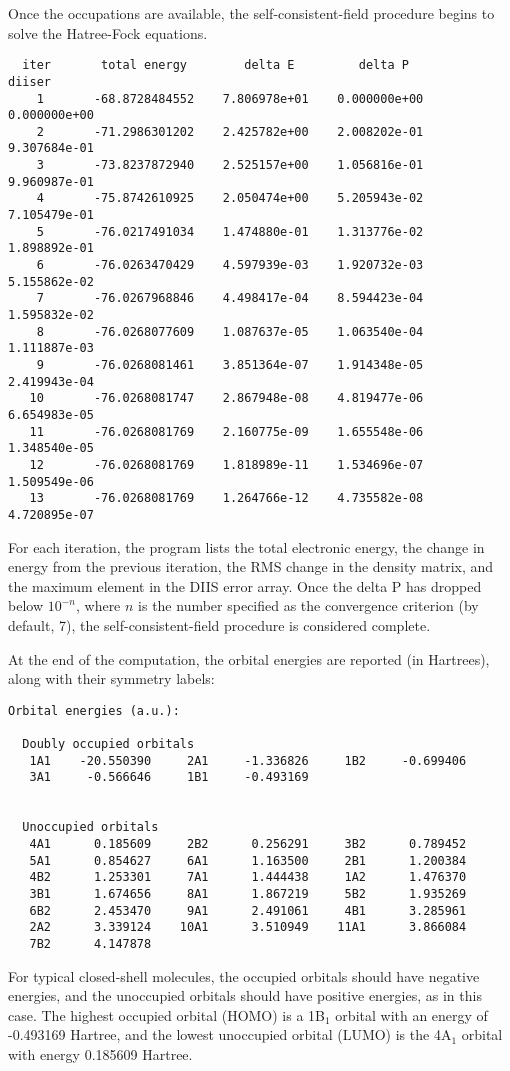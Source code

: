 Once the occupations are available, the self-consistent-field procedure
begins to solve the Hatree-Fock equations.  
\begin{verbatim}
  iter       total energy        delta E         delta P          diiser
    1       -68.8728484552    7.806978e+01    0.000000e+00    0.000000e+00
    2       -71.2986301202    2.425782e+00    2.008202e-01    9.307684e-01
    3       -73.8237872940    2.525157e+00    1.056816e-01    9.960987e-01
    4       -75.8742610925    2.050474e+00    5.205943e-02    7.105479e-01
    5       -76.0217491034    1.474880e-01    1.313776e-02    1.898892e-01
    6       -76.0263470429    4.597939e-03    1.920732e-03    5.155862e-02
    7       -76.0267968846    4.498417e-04    8.594423e-04    1.595832e-02
    8       -76.0268077609    1.087637e-05    1.063540e-04    1.111887e-03
    9       -76.0268081461    3.851364e-07    1.914348e-05    2.419943e-04
   10       -76.0268081747    2.867948e-08    4.819477e-06    6.654983e-05
   11       -76.0268081769    2.160775e-09    1.655548e-06    1.348540e-05
   12       -76.0268081769    1.818989e-11    1.534696e-07    1.509549e-06
   13       -76.0268081769    1.264766e-12    4.735582e-08    4.720895e-07
\end{verbatim}
For each iteration, the program lists the total electronic energy, the
change in energy from the previous iteration, the RMS change in the
density matrix, and the maximum element in the DIIS error array.  Once
the delta P has dropped below $10^{-n}$, where $n$ is the number specified
as the convergence criterion (by default, 7), the self-consistent-field
procedure is considered complete.  

At the end of the computation, the orbital energies are reported (in 
Hartrees), along with their symmetry labels:
\begin{verbatim}
Orbital energies (a.u.):
                                                                                
  Doubly occupied orbitals
   1A1    -20.550390     2A1     -1.336826     1B2     -0.699406
   3A1     -0.566646     1B1     -0.493169
                                                                                
                                                                                
  Unoccupied orbitals
   4A1      0.185609     2B2      0.256291     3B2      0.789452
   5A1      0.854627     6A1      1.163500     2B1      1.200384
   4B2      1.253301     7A1      1.444438     1A2      1.476370
   3B1      1.674656     8A1      1.867219     5B2      1.935269
   6B2      2.453470     9A1      2.491061     4B1      3.285961
   2A2      3.339124    10A1      3.510949    11A1      3.866084
   7B2      4.147878

\end{verbatim}
For typical closed-shell molecules, the occupied orbitals should have
negative energies, and the unoccupied orbitals should have positive
energies, as in this case.  The highest occupied orbital (HOMO) is
a 1B$_1$ orbital with an energy of -0.493169 Hartree, and the lowest
unoccupied orbital (LUMO) is the 4A$_1$ orbital with energy 0.185609 Hartree.

